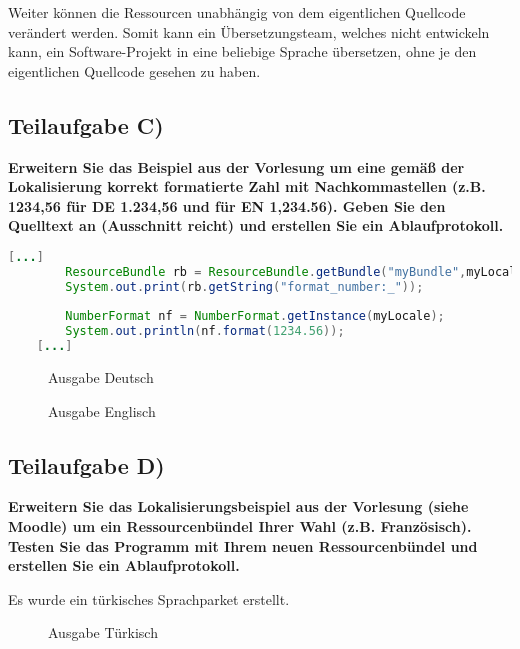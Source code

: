 Weiter können die Ressourcen unabhängig von dem eigentlichen Quellcode verändert
werden. Somit kann ein Übersetzungsteam, welches nicht entwickeln kann, ein
Software-Projekt in eine beliebige Sprache übersetzen, ohne je den eigentlichen
Quellcode gesehen zu haben. 

\subsection{Teilaufgabe C)}
\textbf{Erweitern Sie das Beispiel aus der Vorlesung um eine gemäß der Lokalisierung korrekt
formatierte Zahl mit Nachkommastellen (z.B. 1234,56 für DE 1.234,56 und für EN
1,234.56). Geben Sie den Quelltext an (Ausschnitt reicht) und erstellen Sie ein
Ablaufprotokoll.}

\begin{lstlisting}[language=java, style=java, caption={NumberFormat},
label={lst:lst1}]
	[...]
        ResourceBundle rb = ResourceBundle.getBundle("myBundle",myLocale);
        System.out.print(rb.getString("format_number:_"));
        
        NumberFormat nf = NumberFormat.getInstance(myLocale);
        System.out.println(nf.format(1234.56));       
    [...]
\end{lstlisting}
\begin{figure}[htb]
\begin{center}
\caption{Ausgabe Deutsch}
\end{center}
\end{figure}

\begin{figure}[htb]
\begin{center}
\caption{Ausgabe Englisch}
\end{center}
\end{figure}

\clearpage
\subsection{Teilaufgabe D)}
\textbf{Erweitern Sie das Lokalisierungsbeispiel aus der Vorlesung (siehe Moodle) um ein
Ressourcenbündel Ihrer Wahl (z.B. Französisch). Testen Sie das Programm mit Ihrem
neuen Ressourcenbündel und erstellen Sie ein Ablaufprotokoll.}

Es wurde ein türkisches Sprachparket erstellt.

\begin{figure}[htb]
\begin{center}
\caption{Ausgabe Türkisch}
\end{center}
\end{figure}

